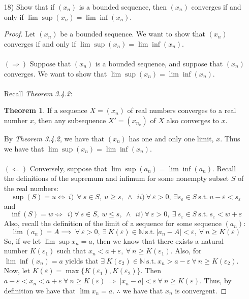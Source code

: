 \documentclass[12pt,letterpaper]{article}
\newcommand{\st}{\ \text{s.t.}\ }
\newcommand{\N}{\mathbb{N}}
\theoremstyle{case}
\theoremstyle{definition}
\newtheorem*{theorem*}{Theorem}
\begin{document}
\begin{enumerate}
\begin{enumerate}
		\item[18)] Show that if $(x_n)$ is a bounded sequence, then $(x_n)$ converges if and only if $\lim \sup (x_n) = \lim \inf (x_n)$.
		\begin{proof}
			Let $(x_n)$ be a bounded sequence. We want to show that $(x_n)$ converges if and only if $\lim \sup (x_n) = \lim \inf (x_n)$.
			\\\\$(\Rightarrow)$ Suppose that $(x_n)$ is a bounded sequence, and suppose that $(x_n)$ converges. We want to show that $\lim \sup (x_n)=\lim \inf (x_n)$.
			\\\\Recall \textit{Theorem 3.4.2}:
			\begin{theorem*}
				If a sequence $X=(x_n)$ of real numbers converges to a real number $x$, then any subsequence $X'=(x_{n_k})$ of $X$ also converges to $x$.
			\end{theorem*}
			By \textit{Theorem 3.4.2}, we have that $(x_n)$ has one and only one limit, $x$. Thus we have that $\lim \sup (x_n)=\lim \inf (x_n)$.
			\\\\$(\Leftarrow)$ Conversely, suppose that $\lim \sup (a_n)=\lim \inf (a_n)$.
			Recall the definitions of the supremum and infimum for some nonempty subset $S$ of the real numbers:
			\[\sup(S)=u \Leftrightarrow\ i)\ \ \forall\ s \in S,\ u \geq s,\ \land\ \ ii)\ \forall\ \varepsilon >0,\ \exists s_\varepsilon \in S \st u-\varepsilon<s_\varepsilon\]
			and
			\[\inf (S)=w \Leftrightarrow\ \ i)\ \forall\ s \in S,\ w \leq s,\ \land\ \ ii)\ \forall\ \varepsilon>0,\ \exists\ s_\varepsilon \in S \st s_\varepsilon<w+\varepsilon\]
			Also, recall the definition of the limit of a sequence for some sequence $(a_n)$:
			\[\lim (a_n)=A \implies\ \forall\ \varepsilon>0,\ \exists\ K(\varepsilon) \in \N \st |a_n-A|<\varepsilon,\ \forall\ n \geq K(\varepsilon)\]
			So, if we let $\lim \sup x_n=a$, then we know that there exists a natural number $K(\varepsilon_1)$ such that $x_n<a+\varepsilon,\ \forall\ n \geq K(\varepsilon_1)$. Also, for $\lim \inf (x_n)=a$ yields that $\exists\ K(\varepsilon_2) \in \N \st x_n>a-\varepsilon\ \forall\ n \geq K(\varepsilon_2)$. Now, let $K(\varepsilon)=\max \{K(\varepsilon_1), K(\varepsilon_2)\}$. Then $a-\varepsilon<x_n<a+\varepsilon\ \forall\ n \geq K(\varepsilon)\ \Rightarrow\ |x_n-a|<\varepsilon\ \forall\ n \geq K(\varepsilon)$. Thus, by definition we have that $\lim x_n=a$.
			$\therefore$ we have that $x_n$ is convergent.
		\end{proof}
		

\end{enumerate}
\end{enumerate}
\end{document}
